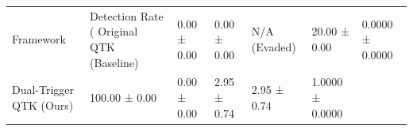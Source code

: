 \begin{tabular}{llllll}
\toprule
Framework & Detection Rate (%
\midrule
Original QTK (Baseline) & 0.00 ± 0.00 & 0.00 ± 0.00 & N/A (Evaded) & 20.00 ± 0.00 & 0.0000 ± 0.0000 \\
Dual-Trigger QTK (Ours) & 100.00 ± 0.00 & 0.00 ± 0.00 & 2.95 ± 0.74 & 2.95 ± 0.74 & 1.0000 ± 0.0000 \\
\bottomrule
\end{tabular}
